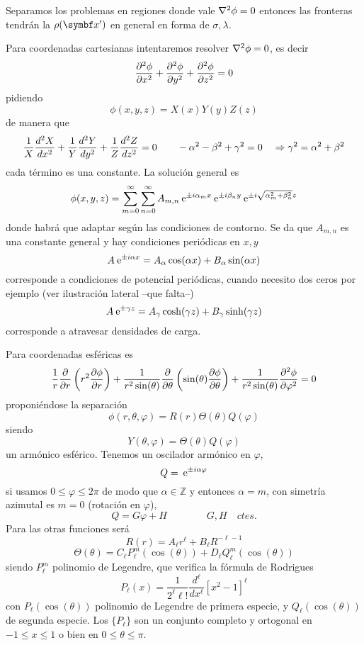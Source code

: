 \documentclass[10pt,oneside]{CBFT_book}
\begin{document}
Separamos los problemas en regiones donde vale $\lapm{\phi} = 0$ entonces las fronteras tendrán la
$\rho(\vb{x}')$ en general en forma de $\sigma,\lambda$.

Para coordenadas cartesianas intentaremos resolver $\lapm{\phi} = 0$, es decir
\[
	\dpar[2]{\phi}{x} + \dpar[2]{\phi}{y}  + \dpar[2]{\phi}{z}  = 0
\]
pidiendo
\[
	\phi(x,y,z) = X(x)Y(y)Z(z)
\]
de manera que 
\[
	\frac{1}{X}\dtot[2]{X}{x} + \frac{1}{Y}\dtot[2]{Y}{y} + \frac{1}{Z}\dtot[2]{Z}{z} = 0 \qquad 
	- \alpha^2  - \beta^2 + \gamma^2 = 0 \quad \Rightarrow  \gamma^2 = \alpha^2 + \beta^2 
\]
cada término es una constante. La solución general es
\[
	\phi(x,y,z) = \sum_{m=0}^\infty \sum_{n=0}^\infty A_{m,n} \euler^{\pm i\alpha_m x}
	\euler^{\pm i\beta_n y} \euler^{\pm i\sqrt{\alpha_m^2 + \beta_n^2 }z}
\]
donde habrá que adaptar según las condiciones de contorno. Se da que $A_{m,n}$ es una constante general
y hay condiciones periódicas en $x,y$
\[
	A\euler^{\pm i\alpha x} = A_\alpha \cos(\alpha x) + B_\alpha \sin(\alpha x)
\]
corresponde a condiciones de potencial periódicas, cuando necesito dos ceros por ejemplo (ver ilustración
lateral --que falta--)
\[
	A\euler^{\pm \gamma z} = A_\gamma \cosh(\gamma z) + B_\gamma \sinh(\gamma z)
\]
corresponde a atravesar densidades de carga.

Para coordenadas esféricas es
\[
	\frac{1}{r} \frac{\partial}{\partial r}\left( r^2 \dpar{\phi}{r} \right) + 
	\frac{1}{r^2 \sin(\theta)}\frac{\partial}{\partial\theta}\left(\sin(\theta)\dpar{\phi}{\theta}\right)+
	\frac{1}{r^2 \sin(\theta)} \dpar[2]{\phi}{\varphi} = 0
\]
proponiéndose la separación
\[
	\phi(r,\theta,\varphi) = R(r) \Theta(\theta) Q(\varphi)
\]
siendo
\[
	Y(\theta,\varphi) = \Theta(\theta) Q(\varphi)
\]
un armónico esférico.
Tenemos un oscilador armónico en $\varphi$,
\[
	Q = \euler^{\pm i\alpha \varphi}
\]
si usamos $0\leq \varphi \leq 2\pi$ de modo que $\alpha\in\mathbb{Z}$ y entonces $\alpha=m$, con simetría
azimutal es $m=0$ (rotación en $\varphi$), 
\[
	Q = G\varphi + H \qquad\qquad  G,H \quad ctes.
\]
Para las otras funciones será
\[
	R(r) = A_\ell r^\ell + B_\ell R^{-\ell-1}
\]
\[
	\Theta(\theta) = C_\ell P_\ell^m (\cos(\theta)) + D_\ell Q_\ell^m (\cos(\theta))
\]
siendo $P_\ell^m$ polinomio de Legendre, que verifica la fórmula de Rodrigues
\[
	P_\ell (x) = \frac{1}{2^\ell \ell!} \frac{d^\ell}{d x^\ell} [x^2 - 1]^\ell
\]
con $P_\ell(\cos(\theta))$ polinomio de Legendre de primera especie, y $Q_\ell(\cos(\theta))$ de segunda
especie.
Los $\{ P_\ell\}$ son un conjunto completo y ortogonal en $-1 \leq x \leq 1$ o bien en $0\leq \theta\leq \pi$.
\end{document}
